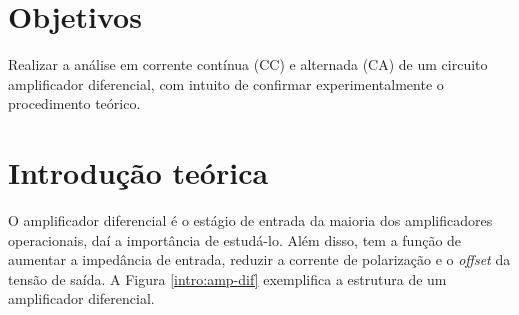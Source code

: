 \documentclass[a4paper,12pt,oneside,openany,table,xcdraw]{article}
\begin{document}
\newcommand{\thedepartment}{Faculdade de Engenharia Elétrica}
\newcommand{\thecourse}{FEELT}
\newcommand{\thetitle}{AMPLIFICADOR DIFERENCIAL}
\newcommand{\thetype}{Relatório da Disciplina de Eletrônica Analógica II}
\newcommand{\theproftitle}{Bacharel em Engenharia Elétrica}
\newcommand{\thestudent}{Lesly Viviane Montúfar Berrios\\
\centering11811ETE001}
\newcommand{\theadvisor}{Prof. Gustavo Brito de Lima}
\newcommand{\thecity}{Uberlândia}

\thispagestyle{empty}


\onehalfspacing
\tableofcontents 
\newpage

\section{Objetivos} %
Realizar a análise em corrente contínua (CC) e alternada (CA) de um circuito amplificador diferencial, com intuito de confirmar experimentalmente o procedimento teórico.

\section{Introdução teórica} 


O amplificador diferencial é o estágio de entrada da maioria dos amplificadores operacionais, daí a importância de estudá-lo. Além disso, tem a função de aumentar a impedância de entrada, reduzir a corrente de polarização e o \emph{offset} da tensão de saída. A Figura \ref{intro:amp-dif} exemplifica a estrutura de um amplificador diferencial.
\end{document}
